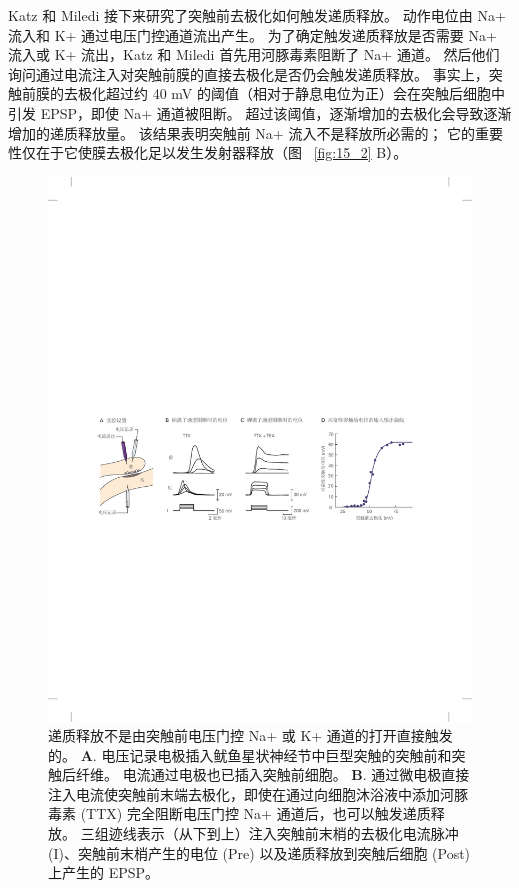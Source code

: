 Katz 和 Miledi 接下来研究了突触前去极化如何触发递质释放。
动作电位由 Na+ 流入和 K+ 通过电压门控通道流出产生。
为了确定触发递质释放是否需要 Na+ 流入或 K+ 流出，Katz 和 Miledi 首先用河豚毒素阻断了 Na+ 通道。
然后他们询问通过电流注入对突触前膜的直接去极化是否仍会触发递质释放。
事实上，突触前膜的去极化超过约 40 mV 的阈值（相对于静息电位为正）会在突触后细胞中引发 EPSP，即使 Na+ 通道被阻断。
超过该阈值，逐渐增加的去极化会导致逐渐增加的递质释放量。
该结果表明突触前 Na+ 流入不是释放所必需的；
它的重要性仅在于它使膜去极化足以发生发射器释放（图 ~\ref{fig:15_2} B）。


\begin{figure}[htbp]
	\centering
	\includegraphics[width=0.95\linewidth]{chap15/fig_15_2}
	\caption{递质释放不是由突触前电压门控 Na+ 或 K+ 通道的打开直接触发的\cite{katz1967study}。
	\textbf{A}. 电压记录电极插入鱿鱼星状神经节中巨型突触的突触前和突触后纤维。
	电流通过电极也已插入突触前细胞。
	\textbf{B}. 通过微电极直接注入电流使突触前末端去极化，即使在通过向细胞沐浴液中添加河豚毒素 (TTX) 完全阻断电压门控 Na+ 通道后，也可以触发递质释放。
	三组迹线表示（从下到上）注入突触前末梢的去极化电流脉冲 (I)、突触前末梢产生的电位 (Pre) 以及递质释放到突触后细胞 (Post) 上产生的 EPSP。
}
\end{figure}
